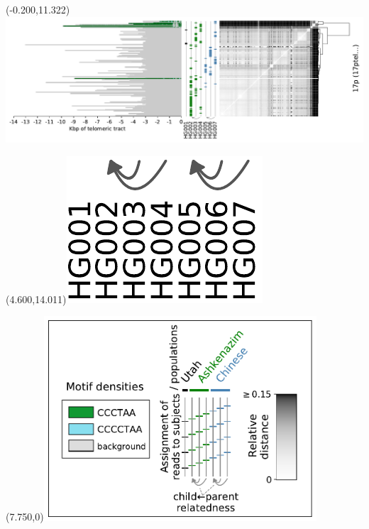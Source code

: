 \documentclass{article}
\begin{document}
\begin{textblock}{13}(-0.200,11.322)\includegraphics{Figure_4/17ptel_1_500K_1_12_12.pdf}\end{textblock}
\begin{textblock}{13}(4.600,14.011)\includegraphics[width=.91in,keepaspectratio]{Figure_4/fatter-arrows-labeled.pdf}\end{textblock}

\begin{textblock}{13}(7.750,0)\includegraphics[width=4.000in,keepaspectratio]{Figure_4/legend.pdf}\end{textblock}
\end{document}
